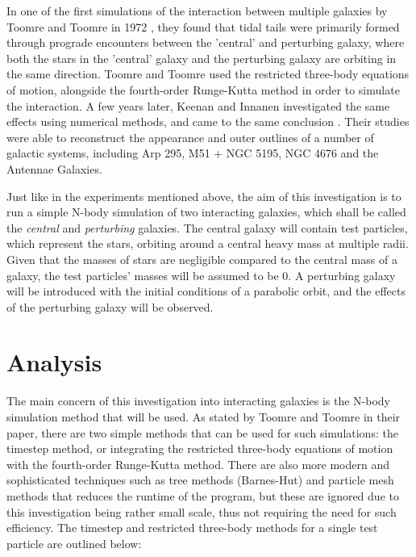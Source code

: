 \documentclass[twoside,twocolumn]{article}
\begin{document}
    In one of the first simulations of the interaction between multiple galaxies by Toomre and Toomre in 1972 \cite{toomre}, they found that tidal tails were primarily formed through prograde encounters between the 'central' and perturbing galaxy, where both the stars in the 'central' galaxy and the perturbing galaxy are orbiting in the same direction. Toomre and Toomre used the restricted three-body equations of motion, alongside the fourth-order Runge-Kutta method in order to simulate the interaction. A few years later, Keenan and Innanen investigated the same effects using numerical methods, and came to the same conclusion \cite{keenan}. Their studies were able to reconstruct the appearance and outer outlines of a number of galactic systems, including Arp 295, M51 + NGC 5195, NGC 4676 and the Antennae Galaxies.

    Just like in the experiments mentioned above, the aim of this investigation is to run a simple N-body simulation of two interacting galaxies, which shall be called the \emph{central} and \emph{perturbing} galaxies. The central galaxy will contain test particles, which represent the stars, orbiting around a central heavy mass at multiple radii. Given that the masses of stars are negligible compared to the central mass of a galaxy, the test particles' masses will be assumed to be 0. A perturbing galaxy will be introduced with the initial conditions of a parabolic orbit, and the effects of the perturbing galaxy will be observed.


\section{Analysis}    

    The main concern of this investigation into interacting galaxies is the N-body simulation method that will be used. As stated by Toomre and Toomre in their paper, there are two simple methods that can be used for such simulations: the timestep method, or integrating the restricted three-body equations of motion with the fourth-order Runge-Kutta method. There are also more modern and sophisticated techniques such as tree methods (Barnes-Hut) and particle mesh methods that reduces the runtime of the program, but these are ignored due to this investigation being rather small scale, thus not requiring the need for such efficiency. The timestep and restricted three-body methods for a single test particle are outlined below:
    \vspace{0.2cm}
\end{document}
